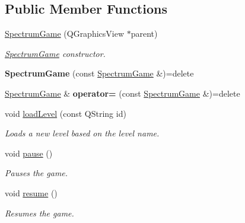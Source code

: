 \subsection*{Public Member Functions}
\begin{DoxyCompactItemize}
\item 
\hyperlink{class_spectrum_game_ac410e5206f57c99ee344d63946c66879}{Spectrum\+Game} (Q\+Graphics\+View $\ast$parent)
\begin{DoxyCompactList}\small\item\em \hyperlink{class_spectrum_game}{Spectrum\+Game} constructor. \end{DoxyCompactList}\item 
\mbox{\label{class_spectrum_game_aaab011291c3d820074b5e2297520164c}} 
{\bfseries Spectrum\+Game} (const \hyperlink{class_spectrum_game}{Spectrum\+Game} \&)=delete
\item 
\mbox{\label{class_spectrum_game_ae12bcb6a32a5333ca8ecde86f7934b8c}} 
\hyperlink{class_spectrum_game}{Spectrum\+Game} \& {\bfseries operator=} (const \hyperlink{class_spectrum_game}{Spectrum\+Game} \&)=delete
\item 
void \hyperlink{class_spectrum_game_aaad553200f65a101e4f6b499385b4b84}{load\+Level} (const Q\+String id)
\begin{DoxyCompactList}\small\item\em Loads a new level based on the level name. \end{DoxyCompactList}\item 
\mbox{\label{class_spectrum_game_a4b01f375f8445c13925bc47561290eaa}} 
void \hyperlink{class_spectrum_game_a4b01f375f8445c13925bc47561290eaa}{pause} ()
\begin{DoxyCompactList}\small\item\em Pauses the game. \end{DoxyCompactList}\item 
\mbox{\label{class_spectrum_game_a8de2864027d73ab1616e272e96f94ccf}} 
void \hyperlink{class_spectrum_game_a8de2864027d73ab1616e272e96f94ccf}{resume} ()
\begin{DoxyCompactList}\small\item\em Resumes the game. \end{DoxyCompactList}\item 

\end{DoxyCompactItemize}

